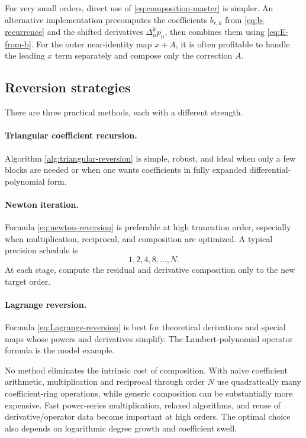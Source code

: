 \documentclass[11pt]{article}
\theoremstyle{pltheorem}
\begin{document}
For very small orders, direct use of \cref{eq:composition-master} is
simpler.  An alternative implementation precomputes the coefficients
\(b_{r,k}\) from \cref{eq:b-recurrence} and the shifted derivatives
\(\Delta_n^kp_n\), then combines them using \cref{eq:E-from-b}.  For the
outer near-identity map \(x+A\), it is often profitable to handle the
leading \(x\) term separately and compose only the correction \(A\).

\subsection{Reversion strategies}

There are three practical methods, each with a different strength.

\paragraph{Triangular coefficient recursion.}
Algorithm \ref{alg:triangular-reversion} is simple, robust, and ideal when only a few blocks are needed or when one wants coefficients in fully expanded differential-polynomial form.

\paragraph{Newton iteration.}
Formula \cref{eq:newton-reversion} is preferable at high truncation order, especially when multiplication, reciprocal, and composition are optimized.  A typical precision schedule is
\[
 1,2,4,8,\ldots,N.
\]
At each stage, compute the residual and derivative composition only to the new target order.

\paragraph{Lagrange reversion.}
Formula \cref{eq:Lagrange-reversion} is best for theoretical derivations and special maps whose powers and derivatives simplify.  The Lambert-polynomial operator formula is the model example.

No method eliminates the intrinsic cost of composition.  With naive coefficient arithmetic, multiplication and reciprocal through order \(N\) use quadratically many coefficient-ring operations, while generic composition can be substantially more expensive.  Fast power-series multiplication, relaxed algorithms, and reuse of derivative/operator data become important at high orders.  The optimal choice also depends on logarithmic degree growth and coefficient swell.
\end{document}
